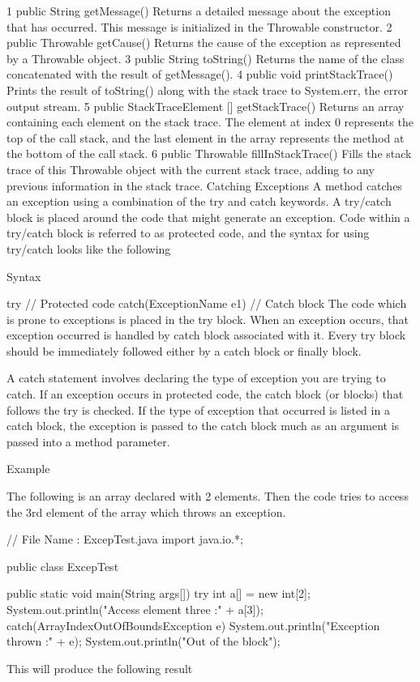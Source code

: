 1	public String getMessage()
Returns a detailed message about the exception that has occurred. This message is initialized in the Throwable constructor.
2	public Throwable getCause()
Returns the cause of the exception as represented by a Throwable object.
3	public String toString()
Returns the name of the class concatenated with the result of getMessage().
4	public void printStackTrace()
Prints the result of toString() along with the stack trace to System.err, the error output stream.
5	public StackTraceElement [] getStackTrace()
Returns an array containing each element on the stack trace. The element at index 0 represents the top of the call stack, and the last element in the array represents the method at the bottom of the call stack.
6	public Throwable fillInStackTrace()
Fills the stack trace of this Throwable object with the current stack trace, adding to any previous information in the stack trace.
Catching Exceptions
A method catches an exception using a combination of the try and catch keywords. A try/catch block is placed around the code that might generate an exception. Code within a try/catch block is referred to as protected code, and the syntax for using try/catch looks like the following

Syntax

try {
   // Protected code
}catch(ExceptionName e1) {
   // Catch block
}
The code which is prone to exceptions is placed in the try block. When an exception occurs, that exception occurred is handled by catch block associated with it. Every try block should be immediately followed either by a catch block or finally block.

A catch statement involves declaring the type of exception you are trying to catch. If an exception occurs in protected code, the catch block (or blocks) that follows the try is checked. If the type of exception that occurred is listed in a catch block, the exception is passed to the catch block much as an argument is passed into a method parameter.

Example

The following is an array declared with 2 elements. Then the code tries to access the 3rd element of the array which throws an exception.

// File Name : ExcepTest.java
import java.io.*;

public class ExcepTest {

   public static void main(String args[]) {
      try {
         int a[] = new int[2];
         System.out.println("Access element three :" + a[3]);
      }catch(ArrayIndexOutOfBoundsException e) {
         System.out.println("Exception thrown  :" + e);
      }
      System.out.println("Out of the block");
   }
}
This will produce the following result

